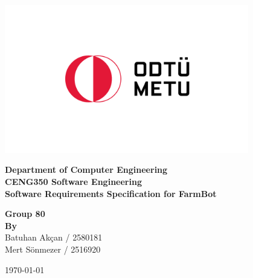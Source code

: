 \begin{titlepage}
   \begin{center}

       \includegraphics[width=0.8\textwidth]{Figures/metu_logo.png}
       \vspace{0.0cm}
     
            
        \textbf{\LARGE Department of  Computer Engineering} \\
        \vspace{0.5cm}
        \textbf{\LARGE CENG350 Software Engineering}\\
        \vspace{0.5cm} 
        \textbf{\LARGE Software Requirements Specification for FarmBot} \\
        \vspace{1.5cm} 
 

        \textbf{Group 80}\\
       \textbf{\textbf{By}} \\Batuhan Akçan / 2580181 \\ Mert Sönmezer / 2516920\\
       

       \vspace{1.5cm}
            
    
\vspace{0.5cm}
            


\today            
   \end{center}
\end{titlepage}